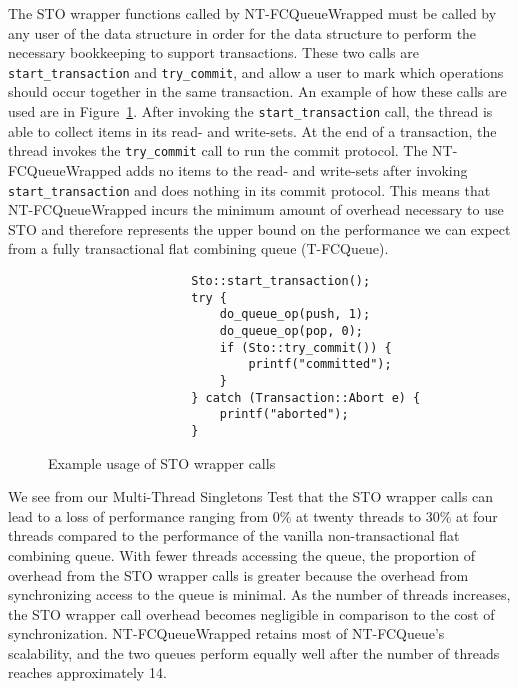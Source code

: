 The STO wrapper functions called by NT-FCQueueWrapped must be called by any user of the data structure in order for the data structure to perform the necessary bookkeeping to support transactions.
These two calls are \texttt{start\_transaction} and \texttt{try\_commit}, and allow a user to mark which operations should occur together in the same transaction. An example of how these calls are used are in Figure~\ref{fig:wrappers}. After invoking the \texttt{start\_transaction} call, the thread is able to collect items in its read- and write-sets. At the end of a transaction, the thread invokes the \texttt{try\_commit} call to run the commit protocol. The NT-FCQueueWrapped adds no items to the read- and write-sets after invoking \texttt{start\_transaction} and does nothing in its commit protocol. This means that NT-FCQueueWrapped incurs the minimum amount of overhead necessary to use STO and therefore represents the upper bound on the performance we can expect from a fully transactional flat combining queue (T-FCQueue). 

\begin{figure}[ht!]
\centering
\singlespace
{}
	\begin{lstlisting}
                    Sto::start_transaction();
                    try {
                        do_queue_op(push, 1);
                        do_queue_op(pop, 0);
                        if (Sto::try_commit()) {
                            printf("committed");
                        }
                    } catch (Transaction::Abort e) {
                        printf("aborted");
                    }
	\end{lstlisting}
\caption{Example usage of STO wrapper calls}
\label{fig:wrappers}
\end{figure}

We see from our Multi-Thread Singletons Test that the STO wrapper calls can lead to a loss of performance ranging from 0\% at twenty threads to 30\% at four threads compared to the performance of the vanilla non-transactional flat combining queue. 
 With fewer threads accessing the queue, the proportion of overhead from the STO wrapper calls is greater because the overhead from synchronizing access to the queue is minimal. As the number of threads increases, the STO wrapper call overhead becomes negligible in comparison to the cost of synchronization.
NT-FCQueueWrapped retains most of NT-FCQueue's scalability, and the two queues perform equally well after the number of threads reaches approximately 14.


